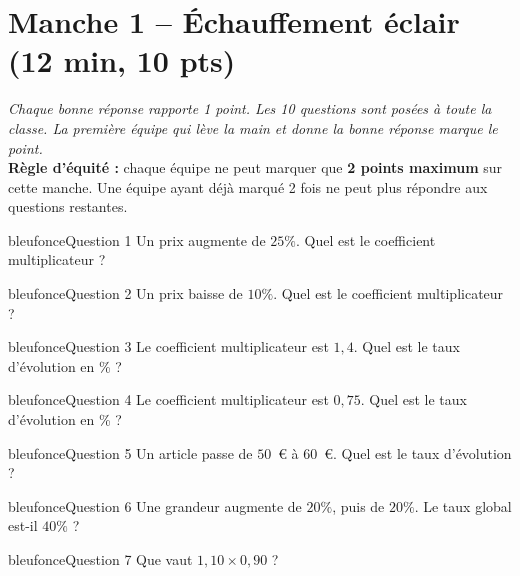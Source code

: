 \documentclass[12pt,a4paper]{article}
\begin{document}
\newpage

\section*{Manche 1 -- Échauffement éclair (12 min, 10 pts)}

\textit{Chaque bonne réponse rapporte 1 point. Les 10 questions sont posées à toute la classe. La première équipe qui lève la main et donne la bonne réponse marque le point.}\\[0.2cm]
\textbf{Règle d'équité :} chaque équipe ne peut marquer que \textbf{2 points maximum} sur cette manche. Une équipe ayant déjà marqué 2 fois ne peut plus répondre aux questions restantes.

\vspace{0.3cm}

\begin{carte}{bleufonce}{Question 1}
Un prix augmente de \(25\%\). Quel est le coefficient multiplicateur ?
\end{carte}

\begin{carte}{bleufonce}{Question 2}
Un prix baisse de \(10\%\). Quel est le coefficient multiplicateur ?
\end{carte}

\begin{carte}{bleufonce}{Question 3}
Le coefficient multiplicateur est \(1{,}4\). Quel est le taux d'évolution en \% ?
\end{carte}

\begin{carte}{bleufonce}{Question 4}
Le coefficient multiplicateur est \(0{,}75\). Quel est le taux d'évolution en \% ?
\end{carte}

\begin{carte}{bleufonce}{Question 5}
Un article passe de \(50\)~\euro{} à \(60\)~\euro{}. Quel est le taux d'évolution ?
\end{carte}

\begin{carte}{bleufonce}{Question 6}
Une grandeur augmente de \(20\%\), puis de \(20\%\). Le taux global est-il \(40\%\) ?
\end{carte}

\begin{carte}{bleufonce}{Question 7}
Que vaut \(1{,}10 \times 0{,}90\) ?
\end{carte}
\end{document}
